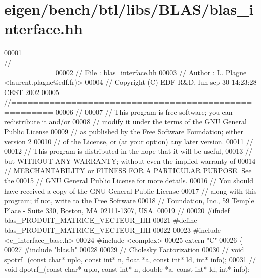 \hypertarget{eigen_2bench_2btl_2libs_2_b_l_a_s_2blas__interface_8hh_source}{}\section{eigen/bench/btl/libs/\+B\+L\+A\+S/blas\+\_\+interface.hh}
\label{eigen_2bench_2btl_2libs_2_b_l_a_s_2blas__interface_8hh_source}

\begin{DoxyCode}
00001 \textcolor{comment}{//=====================================================}
00002 \textcolor{comment}{// File   :  blas\_interface.hh}
00003 \textcolor{comment}{// Author :  L. Plagne <laurent.plagne@edf.fr)>}
00004 \textcolor{comment}{// Copyright (C) EDF R&D,  lun sep 30 14:23:28 CEST 2002}
00005 \textcolor{comment}{//=====================================================}
00006 \textcolor{comment}{//}
00007 \textcolor{comment}{// This program is free software; you can redistribute it and/or}
00008 \textcolor{comment}{// modify it under the terms of the GNU General Public License}
00009 \textcolor{comment}{// as published by the Free Software Foundation; either version 2}
00010 \textcolor{comment}{// of the License, or (at your option) any later version.}
00011 \textcolor{comment}{//}
00012 \textcolor{comment}{// This program is distributed in the hope that it will be useful,}
00013 \textcolor{comment}{// but WITHOUT ANY WARRANTY; without even the implied warranty of}
00014 \textcolor{comment}{// MERCHANTABILITY or FITNESS FOR A PARTICULAR PURPOSE.  See the}
00015 \textcolor{comment}{// GNU General Public License for more details.}
00016 \textcolor{comment}{// You should have received a copy of the GNU General Public License}
00017 \textcolor{comment}{// along with this program; if not, write to the Free Software}
00018 \textcolor{comment}{// Foundation, Inc., 59 Temple Place - Suite 330, Boston, MA  02111-1307, USA.}
00019 \textcolor{comment}{//}
00020 \textcolor{preprocessor}{#ifndef blas\_PRODUIT\_MATRICE\_VECTEUR\_HH}
00021 \textcolor{preprocessor}{#define blas\_PRODUIT\_MATRICE\_VECTEUR\_HH}
00022 
00023 \textcolor{preprocessor}{#include <c\_interface\_base.h>}
00024 \textcolor{preprocessor}{#include <complex>}
00025 \textcolor{keyword}{extern} \textcolor{stringliteral}{"C"}
00026 \{
00027 \textcolor{preprocessor}{#include "blas.h"}
00028 
00029   \textcolor{comment}{// Cholesky Factorization}
00030 \textcolor{comment}{//   void spotrf\_(const char* uplo, const int* n, float *a, const int* ld, int* info);}
00031 \textcolor{comment}{//   void dpotrf\_(const char* uplo, const int* n, double *a, const int* ld, int* info);}

\end{DoxyCode}
